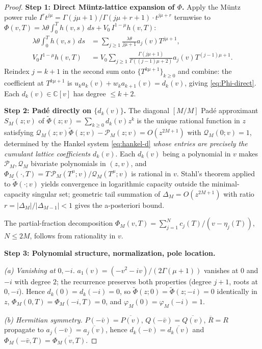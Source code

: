 \documentclass{article}
\newcommand{\C}{\mathbb{C}}
\begin{document}
\begin{proof}
\textbf{Step 1: Direct M\"{u}ntz-lattice expansion of $\Phi$.}
Apply the M\"{u}ntz power rule
$I^r t^{j\mu}=\Gamma(j\mu+1)/\Gamma(j\mu+r+1)\cdot t^{j\mu+r}$
termwise to
$\Phi(v,T)=\lambda\theta\!\int_0^T h(v,s)\,ds+V_0\,I^{1-\mu}h(v,T)$:
\begin{align*}
\lambda\theta\!\int_0^T h(v,s)\,ds
&=\sum_{j\ge 1}\frac{\lambda\theta}{j\mu+1}a_j(v)T^{j\mu+1},\\
V_0 I^{1-\mu}h(v,T)
&=V_0\sum_{j\ge 1}\frac{\Gamma(j\mu+1)}{\Gamma((j-1)\mu+2)}a_j(v)T^{(j-1)\mu+1}.
\end{align*}
Reindex $j=k+1$ in the second sum onto $\{T^{k\mu+1}\}_{k\ge 0}$ and
combine: the coefficient at $T^{k\mu+1}$ is $u_k a_k(v)+w_k a_{k+1}(v)
=d_k(v)$, giving \eqref{eq:Phi-direct}. Each $d_k(v)\in\C[v]$ has
degree $\le k+2$.

\textbf{Step 2: Pad\'{e} directly on $\{d_k(v)\}$.}
The diagonal $[M/M]$ Pad\'{e} approximant $S_M(z;v)$ of
$\widetilde\Phi(z;v)=\sum_{k\ge 0}d_k(v)z^k$ is the unique rational
function in $z$ satisfying
$\mathcal{Q}_M(z;v)\widetilde\Phi(z;v)-\mathcal{P}_M(z;v)=O(z^{2M+1})$
with $\mathcal{Q}_M(0;v)=1$, determined by the Hankel system
\eqref{eq:hankel-d} \emph{whose entries are precisely the cumulant
lattice coefficients $d_k(v)$}. Each $d_k(v)$ being a polynomial in
$v$ makes $\mathcal{P}_M,\mathcal{Q}_M$ bivariate polynomials in
$(z,v)$, and $\Phi_M(\cdot,T)=T\,\mathcal{P}_M(T^\mu;v)/
\mathcal{Q}_M(T^\mu;v)$ is rational in $v$. Stahl's theorem applied
to $\widetilde\Phi(\cdot;v)$ yields convergence in logarithmic
capacity outside the minimal-capacity singular set; geometric tail
summation of $\Delta_M=O(z^{2M+1})$ with ratio
$r=|\Delta_M|/|\Delta_{M-1}|<1$ gives the a-posteriori bound.

The partial-fraction decomposition
$\Phi_M(v,T)=\sum_{j=1}^N c_j(T)/(v-\eta_j(T))$, $N\le 2M$, follows
from rationality in $v$.

\textbf{Step 3: Polynomial structure, normalization, pole location.}

\emph{(a) Vanishing at $0,-i$.} $a_1(v)=(-v^2-iv)/(2\Gamma(\mu+1))$
vanishes at $0$ and $-i$ with degree $2$; the recurrence preserves
both properties (degree $j+1$, roots at $0,-i$). Hence
$d_k(0)=d_k(-i)=0$, so $\widetilde\Phi(z;0)=\widetilde\Phi(z;-i)=0$
identically in $z$, $\Phi_M(0,T)=\Phi_M(-i,T)=0$, and
$\varphi_M(0)=\varphi_M(-i)=1$.

\emph{(b) Hermitian symmetry.} $P(-\bar v)=\overline{P(v)}$,
$Q(-\bar v)=\overline{Q(v)}$, $\overline R=R$ propagate to
$a_j(-\bar v)=\overline{a_j(v)}$, hence $d_k(-\bar v)=\overline{d_k(v)}$
and $\Phi_M(-\bar v,T)=\overline{\Phi_M(v,T)}$.


\end{proof}
\end{document}
